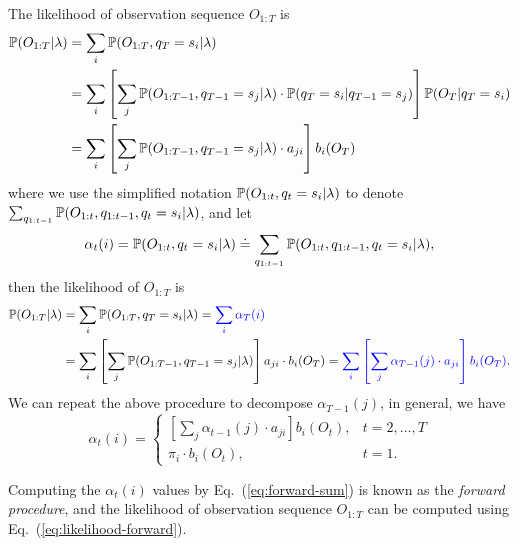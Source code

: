 The likelihood of observation sequence $O_{1:T}$ is
\begin{align*}
\mathbb{P}(O_{1:T} |\lambda) 
&= \sum_{i} \mathbb{P}(O_{1:T}, q_T = s_i |\lambda) \\
&= \sum_{i} \left[ \sum_{j} \mathbb{P}(O_{1:T-1}, q_{T-1} = s_j |\lambda) \cdot \mathbb{P}(q_T = s_i |q_{T-1} = s_j) \right] \mathbb{P}(O_T |q_T = s_i) \\
&= \sum_{i} \left[ \sum_{j} \mathbb{P}(O_{1:T-1}, q_{T-1} = s_j |\lambda) \cdot a_{ji} \right] b_i(O_T)
\end{align*}
where we use the simplified notation $\mathbb{P}(O_{1:t}, q_t = s_i |\lambda)$ to denote $\sum_{q_{1:t-1}} \mathbb{P}(O_{1:t}, q_{1:t-1}, q_t = s_i |\lambda)$,
and let
\begin{equation}
\label{eq:alpha}
\alpha_t(i) = \mathbb{P}(O_{1:t}, q_t = s_i |\lambda) \doteq \sum_{q_{1:t-1}} \mathbb{P}(O_{1:t}, q_{1:t-1}, q_t = s_i |\lambda),
\end{equation}
then the likelihood of $O_{1:T}$ is
\begin{alignat}{2}
\mathbb{P}(O_{1:T} |\lambda) 
&= \sum_{i} \mathbb{P}(O_{1:T}, q_T = s_i |\lambda) 
 = {\color{blue}{\sum_{i} \alpha_T(i)}}  \label{eq:likelihood-forward} \\
&= \sum_{i} \left[ \sum_{j} \mathbb{P}(O_{1:T-1}, q_{T-1} = s_j |\lambda) \right] a_{ji} \cdot b_i(O_T) 
 = {\color{blue}{\sum_{i} \left[ \sum_{j} \alpha_{T-1}(j) \cdot a_{ji} \right] b_i(O_T)}}. \nonumber
\end{alignat}
We can repeat the above procedure to decompose $\alpha_{T-1}(j)$, in general, we have
\begin{equation}
\label{eq:forward-sum}
\alpha_t(i) = \begin{cases}
               \left[ \sum_{j} \alpha_{t-1}(j) \cdot a_{ji} \right] b_i(O_t), & t=2,\dots,T \\
               \pi_i \cdot b_i(O_t), & t=1.
              \end{cases}
\end{equation}

Computing the $\alpha_t(i)$ values by Eq.~(\ref{eq:forward-sum}) is known as the \emph{forward procedure}, 
and the likelihood of observation sequence $O_{1:T}$ can be computed using Eq.~(\ref{eq:likelihood-forward}).

